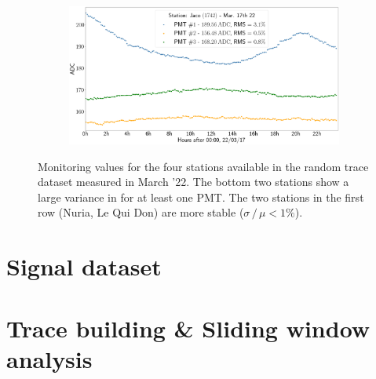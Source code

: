 \begin{landscape}
\begin{figure}
\begin{subfigure}[b]{0.5\textwidth}
        \end{subfigure}
        \begin{subfigure}[b]{0.5\textwidth}   
            \centering 
            \includegraphics[width=0.7\textheight]{./plots/random_trace_diagnostics_jaco.png}
        \end{subfigure}
        \caption{Monitoring values for the four stations available in the random trace dataset measured in March '22. The bottom two stations show a large variance
		in \Ipeak for at least one PMT. The two stations in the first row (Nuria, Le Qui Don) are more stable ($\sigma\,/\,\mu < 1\%$).} 
        \label{fig:random-trace-diagnostics}
    \end{figure}
\end{landscape}


\section{Signal dataset}
\label{sec:signal-dataset}



\section{Trace building \& Sliding window analysis}
\label{sec:sliding-window-analysis}
